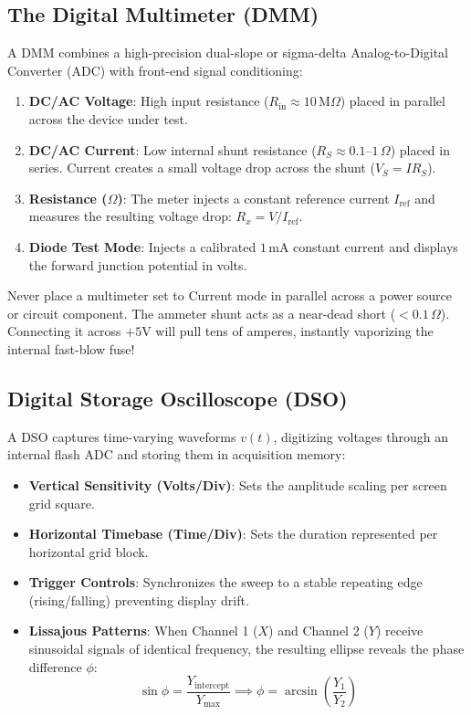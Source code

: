 \subsection{The Digital Multimeter (DMM)}
A DMM combines a high-precision dual-slope or sigma-delta Analog-to-Digital Converter (ADC) with front-end signal conditioning:
\begin{enumerate}
    \item \textbf{DC/AC Voltage}: High input resistance ($R_{\mathrm{in}} \approx 10\,\mathrm{M}\Omega$) placed in parallel across the device under test.
    \item \textbf{DC/AC Current}: Low internal shunt resistance ($R_S \approx 0.1\text{--}1\,\Omega$) placed in series. Current creates a small voltage drop across the shunt ($V_S = I R_S$).
    \item \textbf{Resistance ($\Omega$)}: The meter injects a constant reference current $I_{\mathrm{ref}}$ and measures the resulting voltage drop: $R_x = V / I_{\mathrm{ref}}$.
    \item \textbf{Diode Test Mode}: Injects a calibrated $1\,\mathrm{mA}$ constant current and displays the forward junction potential in volts.
\end{enumerate}

\begin{examtip}
Never place a multimeter set to Current mode in parallel across a power source or circuit component. The ammeter shunt acts as a near-dead short ($< 0.1\,\Omega$). Connecting it across $+5\text{V}$ will pull tens of amperes, instantly vaporizing the internal fast-blow fuse!
\end{examtip}

\subsection{Digital Storage Oscilloscope (DSO)}
A DSO captures time-varying waveforms $v(t)$, digitizing voltages through an internal flash ADC and storing them in acquisition memory:
\begin{itemize}
    \item \textbf{Vertical Sensitivity (Volts/Div)}: Sets the amplitude scaling per screen grid square.
    \item \textbf{Horizontal Timebase (Time/Div)}: Sets the duration represented per horizontal grid block.
    \item \textbf{Trigger Controls}: Synchronizes the sweep to a stable repeating edge (rising/falling) preventing display drift.
    \item \textbf{Lissajous Patterns}: When Channel 1 ($X$) and Channel 2 ($Y$) receive sinusoidal signals of identical frequency, the resulting ellipse reveals the phase difference $\phi$:
    \[ \sin \phi = \frac{Y_{\mathrm{intercept}}}{Y_{\max}} \implies \phi = \arcsin\left(\frac{Y_1}{Y_2}\right) \]
\end{itemize}

